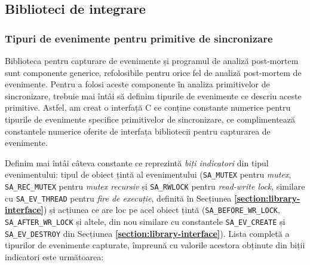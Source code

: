 \subsection{Biblioteci de integrare}
\label{integration-libraries}

\subsubsection{Tipuri de evenimente pentru primitive de sincronizare}

Biblioteca pentru capturare de evenimente și programul de analiză
post-mortem sunt componente generice, refolosibile pentru orice fel de
analiză post-mortem de evenimente. Pentru a folosi aceste componente în
analiza primitivelor de sincronizare, trebuie mai întâi să definim
tipurile de evenimente ce descriu aceste primitive. Astfel, am creat
o interfață C ce conține constante numerice pentru tipurile de
evenimente specifice primitivelor de sincronizare, ce complimentează
constantele numerice oferite de interfața bibliotecii pentru capturarea
de evenimente.

Definim mai întâi câteva constante ce reprezintă
\textit{biți indicatori} din tipul evenimentului: tipul de obiect
țintă al evenimentului (\lstinline{SA_MUTEX} pentru \textit{mutex},
\lstinline{SA_REC_MUTEX} pentru \textit{mutex recursiv} și
\lstinline{SA_RWLOCK} pentru \textit{read-write lock}, similare cu
\lstinline{SA_EV_THREAD} pentru \textit{fire de execuție}, definită în
Secțiunea \textbf{\ref{section:library-interface}}) și acțiunea ce are
loc pe acel obiect țintă (\lstinline{SA_BEFORE_WR_LOCK},
\lstinline{SA_AFTER_WR_LOCK} și altele, din nou similare cu constantele
\lstinline{SA_EV_CREATE} și \lstinline{SA_EV_DESTROY} din Secțiunea
\textbf{\ref{section:library-interface}}). Lista completă a tipurilor de
evenimente capturate, împreună cu valorile acestora obținute din biții
indicatori este următoarea:

